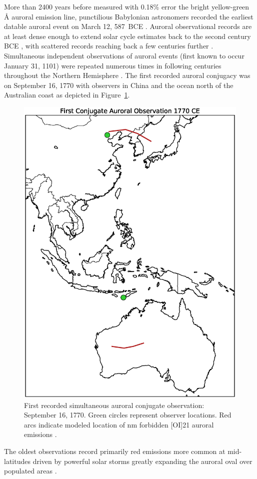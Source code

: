 More than 2400 years before \citet{angstrom1869} measured with 0.18\% error the bright yellow-green \unit[5577]{\AA} auroral emission line, punctilious Babylonian astronomers recorded the earliest datable auroral event on March 12, 587~BCE \citep{stephenson2004}.
Auroral observational records are at least dense enough to extend solar cycle estimates back to the second century BCE \citep{stothers1979}, with scattered records reaching back a few centuries further \citep{siscoe2002,silverman2006}.
Simultaneous independent observations of auroral events (first known to occur January 31, 1101) were repeated numerous times in following centuries throughout the Northern Hemisphere \citep{willis1999}.
The first recorded auroral conjugacy was on September 16, 1770 with observers in China and the ocean north of the Australian coast \citep{willis1996} as depicted in Figure~\ref{fig:firstconj}.
\begin{figure}\centering
    \includegraphics[width=0.8\linewidth]{gfx/firstconj}
    \caption{First recorded simultaneous auroral conjugate observation: September 16, 1770. Green circles represent observer locations. Red arcs indicate modeled location of \unit[630]{nm} forbidden [OI]21 auroral emissions \citep{willis1996}.}\label{fig:firstconj}
\end{figure}
The oldest observations record primarily red emissions more common at mid-latitudes driven by powerful solar storms greatly expanding the auroral oval over populated areas \citep{silverman1998}.

